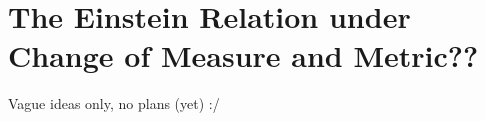 \chapter{The Einstein Relation under Change of Measure and Metric??}

Vague ideas only, no plans (yet) :/